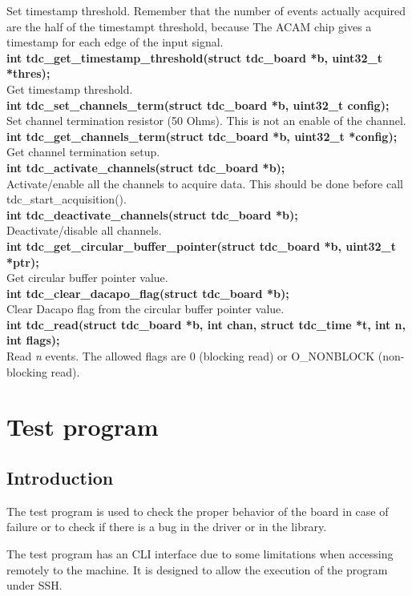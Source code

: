 \documentclass[a4paper,11pt]{article}
\begin{document}
Set timestamp threshold. Remember that the number of events actually acquired are the half of the timestampt threshold, because The ACAM chip gives a timestamp for each edge of the input signal. \\
\textbf{int tdc\_get\_timestamp\_threshold(struct tdc\_board *b, uint32\_t *thres);} \\
Get timestamp threshold.\\
\textbf{int tdc\_set\_channels\_term(struct tdc\_board *b, uint32\_t config);} \\
Set channel termination resistor (50 Ohms). This is not an enable of the channel. \\
\textbf{int tdc\_get\_channels\_term(struct tdc\_board *b, uint32\_t *config);} \\
Get channel termination setup. \\
\textbf{int tdc\_activate\_channels(struct tdc\_board *b);} \\
Activate/enable all the channels to acquire data. This should be done before call tdc\_start\_acquisition(). \\
\textbf{int tdc\_deactivate\_channels(struct tdc\_board *b);} \\
Deactivate/disable all channels. \\
\textbf{int tdc\_get\_circular\_buffer\_pointer(struct tdc\_board *b, uint32\_t *ptr);} \\
Get circular buffer pointer value.\\
\textbf{int tdc\_clear\_dacapo\_flag(struct tdc\_board *b);} \\
Clear Dacapo flag from the circular buffer pointer value.\\
\textbf{int tdc\_read(struct tdc\_board *b, int chan, struct tdc\_time *t,
		    int n, int flags);} \\
Read \textit{n} events. The allowed flags are 0 (blocking read) or O\_NONBLOCK (non-blocking read).

\section{Test program}
\subsection{Introduction}
The test program is used to check the proper behavior of the board in case of failure or to check if there is a bug in the driver or in the library.

The test program has an CLI interface due to some limitations when accessing remotely to the machine. It is designed to allow the execution of the program under SSH.
\end{document}

